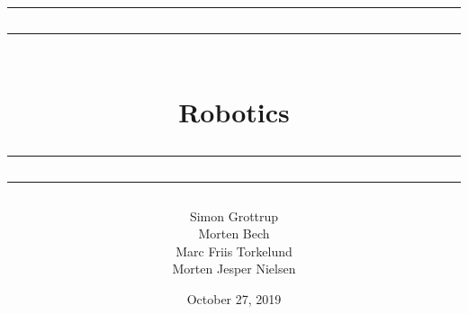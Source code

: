 \documentclass[12pt,a4paper]{article}
\newcommand\mymaketitle[1]{
   \rule{\textwidth}{1.6pt}\vspace*{-\baselineskip}\vspace*{2pt}
   \rule{\textwidth}{0.4pt}
   \\   
   \huge \bf #1\\
   \vspace{-8pt}
   \rule{\textwidth}{0.4pt}\vspace*{-\baselineskip}\vspace{3.2pt}
   \rule{\textwidth}{1.6pt}
}
\begin{document}
\title{
	\mymaketitle{Robotics}
}

\date{October 27, 2019}
\author{
	Simon Grottrup\\
	Morten Bech\\
	Marc Friis Torkelund\\
	Morten Jesper Nielsen\\
}


\maketitle



%
%
\end{document}
